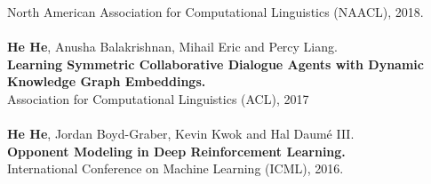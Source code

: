 \documentclass[a4paper,11pt]{article}
\begin{document}
North American Association for Computational Linguistics (NAACL), 2018.\\
\\
{\bf He He}, Anusha Balakrishnan, Mihail Eric and Percy Liang.\\
{\bf Learning Symmetric Collaborative Dialogue Agents with Dynamic Knowledge Graph Embeddings.}\\
Association for Computational Linguistics (ACL), 2017\\
\\
{\bf He He}, Jordan Boyd-Graber, Kevin Kwok and Hal Daum\'e III.\\
{\bf Opponent Modeling in Deep Reinforcement Learning.}\\
International Conference on Machine Learning (ICML), 2016.\\
\\
\end{document}
